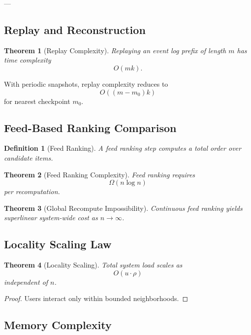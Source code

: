\documentclass[11pt]{article}
\newtheorem{definition}{Definition}
\newtheorem{theorem}{Theorem}
\begin{document}
---

\subsection{Replay and Reconstruction}

\begin{theorem}[Replay Complexity]
Replaying an event log prefix of length $m$ has time complexity
\[
O(mk).
\]
\end{theorem}

\begin{corollary}
With periodic snapshots, replay complexity reduces to
\[
O((m - m_0)k)
\]
for nearest checkpoint $m_0$.
\end{corollary}

\subsection{Feed-Based Ranking Comparison}

\begin{definition}[Feed Ranking]
A feed ranking step computes a total order over candidate items.
\end{definition}

\begin{theorem}[Feed Ranking Complexity]
Feed ranking requires
\[
\Omega(n \log n)
\]
per recomputation.
\end{theorem}

\begin{theorem}[Global Recompute Impossibility]
Continuous feed ranking yields superlinear system-wide cost as $n \to \infty$.
\end{theorem}

\subsection{Locality Scaling Law}

\begin{theorem}[Locality Scaling]
Total system load scales as
\[
O(u \cdot \rho)
\]
independent of $n$.
\end{theorem}

\begin{proof}
Users interact only within bounded neighborhoods.
\end{proof}

\subsection{Memory Complexity}
\end{document}

